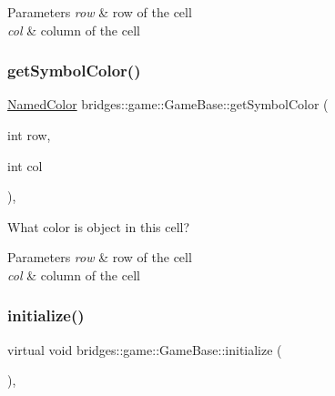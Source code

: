 \begin{DoxyParams}{Parameters}
{\em row} & row of the cell \\
\hline
{\em col} & column of the cell \\
\hline
\end{DoxyParams}
\mbox{\label{classbridges_1_1game_1_1_game_base_a26c9f9547cc6f992a829ce5d6edd8f85}} 
\subsubsection{\texorpdfstring{get\+Symbol\+Color()}{getSymbolColor()}}
{\footnotesize\ttfamily \mbox{\hyperlink{namespacebridges_1_1game_afaa832a4322b25b6a4ebfba832f10f26}{Named\+Color}} bridges\+::game\+::\+Game\+Base\+::get\+Symbol\+Color (\begin{DoxyParamCaption}\item[{int}]{row,  }\item[{int}]{col }\end{DoxyParamCaption})\hspace{0.3cm}{\ttfamily [inline]}, {\ttfamily [protected]}}



What color is object in this cell? 


\begin{DoxyParams}{Parameters}
{\em row} & row of the cell \\
\hline
{\em col} & column of the cell \\
\hline
\end{DoxyParams}
\mbox{\label{classbridges_1_1game_1_1_game_base_a9b6eb6fa7fceaac09d204b549164037f}} 
\subsubsection{\texorpdfstring{initialize()}{initialize()}}
{\footnotesize\ttfamily virtual void bridges\+::game\+::\+Game\+Base\+::initialize (\begin{DoxyParamCaption}{ }\end{DoxyParamCaption})\hspace{0.3cm}{\ttfamily [protected]}, {}}




